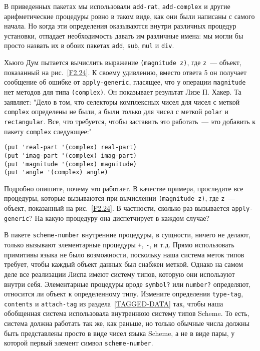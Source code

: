 В приведенных пакетах мы использовали
{\tt add-rat}, {\tt add-complex} и другие арифметические
процедуры ровно в таком виде, как они были написаны с самого начала.
Но когда эти определения оказываются внутри различных процедур
установки,  отпадает необходимость давать им различные имена: мы могли бы
просто назвать их в обоих пакетах  {\tt add}, {\tt sub},
{\tt mul} и {\tt div}.
\begin{exercise}{2.77}\label{EX2.77}%
Хьюго Дум пытается вычислить выражение
{\tt (magnitude z)}, где {\tt z}~--- объект, показанный
на рис.~\ref{F2.24}.  К своему удивлению, вместо ответа 5
он получает сообщение об ошибке от {\tt apply-generic},
гласящее, что у операции {\tt magnitude} нет методов для типа
{\tt (complex)}.  Он показывает результат Лизе П. Хакер.  Та
заявляет: "Дело в том, что селекторы комплексных чисел для чисел с
меткой {\tt complex} определены не были, а были только для
чисел с меткой {\tt polar} и {\tt rectangular}.  Все,
что требуется, чтобы заставить это работать~--- это добавить к пакету
{\tt complex} следующее:"

\begin{Verbatim}[fontsize=\small]
(put 'real-part '(complex) real-part)
(put 'imag-part '(complex) imag-part)
(put 'magnitude '(complex) magnitude)
(put 'angle '(complex) angle)
\end{Verbatim}
Подробно опишите, почему это работает.  В качестве примера, проследите
все процедуры, которые вызываются при вычислении 
{\tt (magnitude z)}, где {\tt z}~--- объект, показанный
на рис.~\ref{F2.24}.  В частности, сколько раз вызывается
{\tt apply-generic}?  На какую процедуру она диспетчирует в
каждом случае?
\end{exercise}
\begin{exercise}{2.78}\label{EX2.78}%
В пакете {\tt scheme-number} внутренние
процедуры, в сущности, ничего не делают, только вызывают элементарные
процедуры {\tt +}, {\tt -}, и т.д. Прямо использовать
примитивы языка не было возможности, поскольку наша система меток
типов требует, чтобы каждый объект данных был снабжен меткой.  
Однако на самом деле все реализации Лиспа имеют систему типов, которую они
используют внутри себя.  Элементарные процедуры вроде
{\tt symbol?}
или {\tt number?}
определяют, относится ли
объект к определенному типу.  Измените определения  {\tt type-tag},
{\tt contents} и {\tt attach-tag} из
раздела~\ref{TAGGED-DATA} так, чтобы наша обобщенная система
использовала внутреннюю систему типов Scheme.  То есть, система должна
работать так же, как раньше, но только обычные числа должны быть
представлены просто в виде чисел языка Scheme, а не в виде пары, у
которой первый элемент символ {\tt scheme-number}.
\end{exercise}
